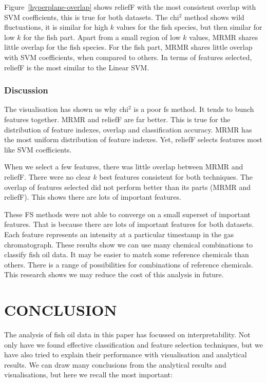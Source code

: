 \documentclass{article}
\begin{document}
Figure~\ref{hyperplane-overlap} shows reliefF with the most consistent overlap with SVM coefficients, this is true for both datasets.
The chi$^2$ method shows wild fluctuations, it is similar for high $k$ values for the fish species, but then similar for low $k$ for the fish part.
Apart from a small region of low $k$ values, MRMR shares little overlap for the fish species.
For the fish part, MRMR shares little overlap with SVM coefficients, when compared to others.
In terms of features selected, reliefF is the most similar to the Linear SVM.

\subsubsection{Discussion}
\label{sec:visualisation-discussion}

The visualisation has shown us why chi$^2$ is a poor fs method.
It tends to bunch features together.
MRMR and reliefF are far better.
This is true for the distribution of feature indexes, overlap and classification accuracy.
MRMR has the most uniform distribution of feature indexes.
Yet, reliefF selects features most like SVM coefficients.

When we select a few features, there was little overlap between MRMR and reliefF.
There were no clear $k$ best features consistent for both techniques.
The overlap of features selected did not perform better than its parts (MRMR and reliefF).
This shows there are lots of important features.

These FS methods were not able to converge on a small superset of important features.
That is because there are lots of important features for both datasets.
Each feature represents an intensity at a particular timestamp in the gas chromatograph.
These results show we can use many chemical combinations to classify fish oil data.
It may be easier to match some reference chemicals than others.
There is a range of possibilities for combinations of reference chemicals.
This research shows we may reduce the cost of this analysis in future.

\section{CONCLUSION}
\label{sec:conclusion}

The analysis of fish oil data in this paper has focussed on interpretability. Not only have we found effective classification and feature selection techniques, but we have also tried to explain their performance with visualisation and analytical results. We can draw many conclusions from the analytical results and visualisations, but here we recall the most important:
\end{document}
